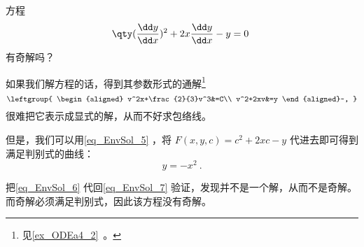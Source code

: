 \begin{example}{}
方程
\begin{equation}\label{eq_EnvSol_7}
\qty(\frac{\dd y}{\dd x})^2+2x\frac{\dd y}{\dd x}-y=0~
\end{equation}
有奇解吗？

如果我们解方程的话，得到其参数形式的通解\footnote{见\autoref{ex_ODEa4_2}~。}
\begin{equation}
\leftgroup{
    \begin{aligned}
    v^2x+\frac{2}{3}v^3&=C\\
    v^2+2xv&=y
    \end{aligned}~,
}
\end{equation}
很难把它表示成显式的解，从而不好求包络线。

但是，我们可以用\autoref{eq_EnvSol_5} ，将 $F(x, y, c)=c^2+2xc-y$ 代进去即可得到满足判别式的曲线：
\begin{equation}\label{eq_EnvSol_6}
y=-x^2~.
\end{equation}

把\autoref{eq_EnvSol_6} 代回\autoref{eq_EnvSol_7} 验证，发现并不是一个解，从而不是奇解。而奇解必须满足判别式，因此该方程没有奇解。

\end{example}

